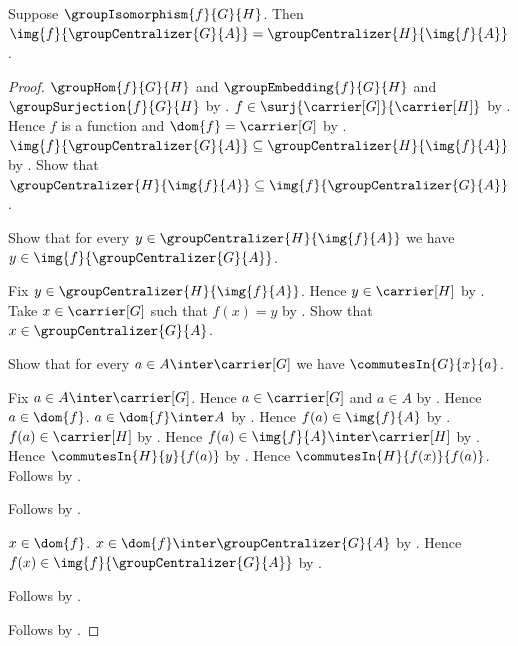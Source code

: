 \begin{theorem}\label{group_isomorphism_centralizer_image}
    Suppose $\groupIsomorphism{f}{G}{H}$.
    Then
        $\img{f}{\groupCentralizer{G}{A}}=
        \groupCentralizer{H}{\img{f}{A}}$.
\end{theorem}
\begin{proof}
    $\groupHom{f}{G}{H}$ and $\groupEmbedding{f}{G}{H}$ and
        $\groupSurjection{f}{G}{H}$ by
        .
    $f\in\surj{\carrier[G]}{\carrier[H]}$ by
        .
    Hence $f$ is a function and $\dom{f}=\carrier[G]$ by
        .
    $\img{f}{\groupCentralizer{G}{A}}\subseteq
        \groupCentralizer{H}{\img{f}{A}}$ by
        .
    Show that $\groupCentralizer{H}{\img{f}{A}}\subseteq
        \img{f}{\groupCentralizer{G}{A}}$.
    \begin{subproof}
        Show that for every
            $y\in\groupCentralizer{H}{\img{f}{A}}$ we have
            $y\in\img{f}{\groupCentralizer{G}{A}}$.
        \begin{subproof}
            Fix $y\in\groupCentralizer{H}{\img{f}{A}}$.
            Hence $y\in\carrier[H]$ by .
            Take $x\in\carrier[G]$ such that $f(x)=y$ by .
            Show that $x\in\groupCentralizer{G}{A}$.
            \begin{subproof}
                Show that for every $a\in A\inter\carrier[G]$ we have
                    $\commutesIn{G}{x}{a}$.
                \begin{subproof}
                    Fix $a\in A\inter\carrier[G]$.
                    Hence $a\in\carrier[G]$ and $a\in A$ by
                        .
                    Hence $a\in\dom{f}$.
                    $a\in\dom{f}\inter A$ by .
                    Hence $f(a)\in\img{f}{A}$ by
                        .
                    $f(a)\in\carrier[H]$ by
                        .
                    Hence $f(a)\in\img{f}{A}\inter\carrier[H]$ by
                        .
                    Hence $\commutesIn{H}{y}{f(a)}$ by
                        .
                    Hence $\commutesIn{H}{f(x)}{f(a)}$.
                    Follows by .
                \end{subproof}
                Follows by .
            \end{subproof}
            $x\in\dom{f}$.
            $x\in\dom{f}\inter\groupCentralizer{G}{A}$ by
                .
            Hence $f(x)\in\img{f}{\groupCentralizer{G}{A}}$ by
                .
        \end{subproof}
        Follows by .
    \end{subproof}
    Follows by .
\end{proof}

